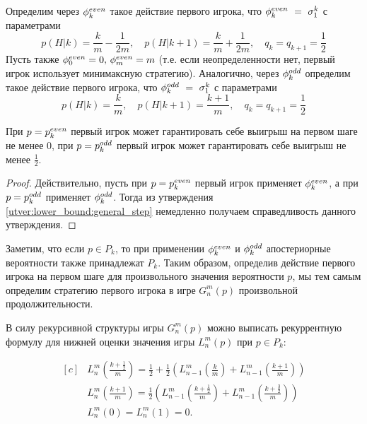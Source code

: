 Определим через $ \phi_k^{even} $ такое действие первого игрока, что $ \phi_k^{even}~=~\sigma^k_1 $ с параметрами
\begin{equation*}
  p(H|k) = \frac{k}{m} - \frac{1}{2m}, \quad
  p(H|k+1) = \frac{k}{m} + \frac{1}{2m}, \quad
  q_k = q_{k+1} = \frac{1}{2}
\end{equation*}
Пусть также $ \phi_0^{even} = 0,\, \phi_m^{even} = m $ (т.е. если неопределенности нет, первый игрок использует минимаксную стратегию).
Аналогично, через $ \phi_k^{odd} $ определим такое действие первого игрока, что $ \phi_k^{odd}~=~\sigma^k_1 $ с параметрами
\begin{equation*}
  p(H|k) = \frac{k}{m}, \quad
  p(H|k+1) = \frac{k + 1}{m}, \quad
  q_k = q_{k+1} = \frac{1}{2}
\end{equation*}

\begin{utver}
  При $ p = p_k^{even} $ первый игрок может гарантировать себе выигрыш на первом шаге не менее $ 0 $, при $ p = p_k^{odd} $ первый игрок может гарантировать себе выигрыш не менее $ \frac{1}{2} $.
\end{utver}
\begin{proof}
  Действительно, пусть при $ p = p_k^{even} $ первый игрок применяет $ \phi_k^{even} $, а при $ p = p_k^{odd} $ применяет $ \phi_k^{odd} $. Тогда из утверждения \ref{utver:lower_bound:general_step} немедленно получаем справедливость данного утверждения.
\end{proof}

Заметим, что если $ p \in P_k $, то при применении $ \phi_k^{even} $ и $ \phi_k^{odd} $ апостериорные вероятности также принадлежат $ P_k $.
Таким образом, определив действие первого игрока на первом шаге для произвольного значения вероятности $ p $, мы тем самым определим стратегию первого игрока в игре $ G_n^m(p) $ произвольной продолжительности.

В силу рекурсивной структуры игры $ G_n^m(p) $ можно выписать рекуррентную формулу для нижней оценки значения игры $ L_n^m(p) $ при $ p \in P_k $:

\begin{equation}
\label{eq:lower_bound:recurrence_finite}
\begin{aligned}[c]
&L_n^m\left(\frac{k+\frac{1}{2}}{m}\right) = 
    \frac{1}{2} + \frac{1}{2}\left(
        L_{n-1}^m\left(\frac{k}{m}\right) + 
        L_{n-1}^m\left(\frac{k + 1}{m}\right)
    \right) \\
&L_n^m\left(\frac{k+1}{m}\right) = 
    \frac{1}{2}\left(
        L_{n-1}^m\left(\frac{k+\frac{1}{2}}{m}\right) + 
        L_{n-1}^m\left(\frac{k+\frac{3}{2}}{m}\right)
    \right) \\
&L_n^m(0) = L_n^m(1) = 0.
\end{aligned}
\end{equation}

